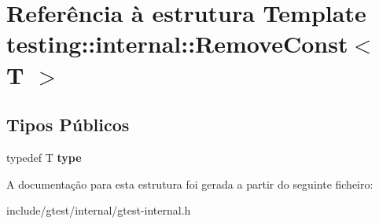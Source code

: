 \hypertarget{structtesting_1_1internal_1_1RemoveConst}{\section{Referência à estrutura Template testing\-:\-:internal\-:\-:Remove\-Const$<$ T $>$}
\label{structtesting_1_1internal_1_1RemoveConst}
}
\subsection*{Tipos Públicos}
\begin{DoxyCompactItemize}
\item 
\hypertarget{structtesting_1_1internal_1_1RemoveConst_a1be32027ea4edcc0d15abd59aba4a97f}{typedef T {\bfseries type}}\label{structtesting_1_1internal_1_1RemoveConst_a1be32027ea4edcc0d15abd59aba4a97f}

\end{DoxyCompactItemize}


A documentação para esta estrutura foi gerada a partir do seguinte ficheiro\-:\begin{DoxyCompactItemize}
\item 
include/gtest/internal/gtest-\/internal.\-h\end{DoxyCompactItemize}
